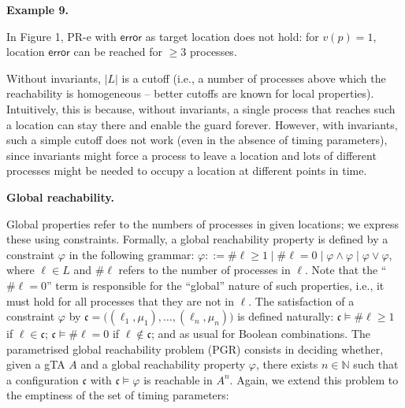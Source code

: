 \documentclass[10pt,a4paper]{article}
\begin{document}
\par\medskip\noindent\textbf{Example 9.}\par
 
 
In Figure 1, PR-e with $\mathsf{error}$ as target location does not hold: for $v(p)=1$, location $\mathsf{error}$ can be reached for $\geq 3$ processes.\par
 
 
 
 
Without invariants, $|L|$ is a cutoff (i.e., a number of processes above which the reachability is homogeneous -- better cutoffs are known for local properties). Intuitively, this is because, without invariants, a single process that reaches such a location can stay there and enable the guard forever. However, with invariants, such a simple cutoff does not work (even in the absence of timing parameters), since invariants might force a process to leave a location and lots of different processes might be needed to occupy a location at different points in time.\par
 
 
 
 
\par\medskip\noindent\textbf{Global reachability.}\par
 
 
Global properties refer to the numbers of processes in given locations; we express these using constraints. Formally, a global reachability property is defined by a constraint $\varphi$ in the following grammar: $\varphi::=\#\mathrm{\ell}\geq 1\mid\#\mathrm{\ell}=0\mid\varphi\land\varphi\mid\varphi\lor\varphi$, where $\mathrm{\ell}\in L$ and $\#\mathrm{\ell}$ refers to the number of processes in $\mathrm{\ell}$. Note that the “$\#\mathrm{\ell}=0$” term is responsible for the “global” nature of such properties, i.e., it must hold for all processes that they are not in $\mathrm{\ell}$. The satisfaction of a constraint $\varphi$ by $\mathfrak{c}=\big((\mathrm{\ell}_{1},\mu_{1}),\ldots,(\mathrm{\ell}_{n},\mu_{n})\big)$ is defined naturally: $\mathfrak{c}\models\#\mathrm{\ell}\geq 1$ if $\mathrm{\ell}\in\mathfrak{c}$; $\mathfrak{c}\models\#\mathrm{\ell}=0$ if $\mathrm{\ell}\notin\mathfrak{c}$; and as usual for Boolean combinations. The parametrised global reachability problem (PGR) consists in deciding whether, given a gTA ${A}$ and a global reachability property $\varphi$, there exists $n\in\mathbb{N}$ such that a configuration $\mathfrak{c}$ with $\mathfrak{c}\models\varphi$ is reachable in ${{A}}^{n}$. Again, we extend this problem to the emptiness of the set of timing parameters:\par
 
\end{document}
